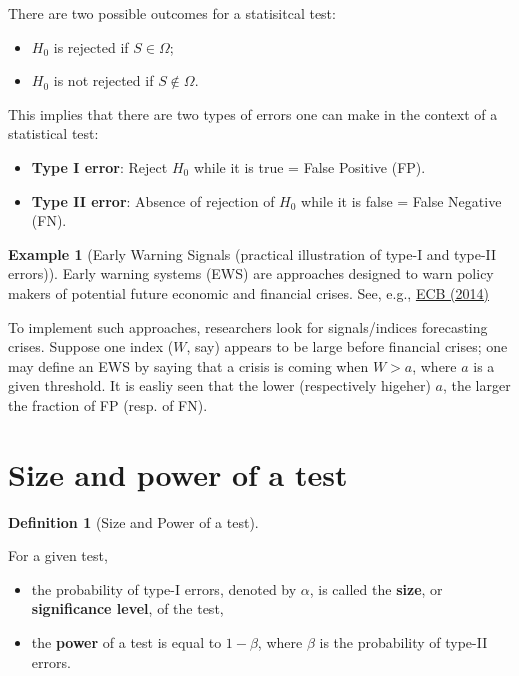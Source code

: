 \documentclass[
  12pt,
]{book}
\providecommand{\tightlist}{%
  \setlength{\itemsep}{0pt}\setlength{\parskip}{0pt}}
\theoremstyle{definition}
\newtheorem{definition}{Definition}[chapter]
\theoremstyle{definition}
\newtheorem{example}{Example}[chapter]
\theoremstyle{definition}
\theoremstyle{definition}
\theoremstyle{remark}
\begin{document}
There are two possible outcomes for a statisitcal test:

\begin{itemize}
\tightlist
\item
  \(H_0\) is rejected if \(S \in \Omega\);
\item
  \(H_0\) is not rejected if \(S \not\in \Omega\).
\end{itemize}

This implies that there are two types of errors one can make in the context of a statistical test:

\begin{itemize}
\tightlist
\item
  \textbf{Type I error}: Reject \(H_0\) while it is true = False Positive (FP).
\item
  \textbf{Type II error}: Absence of rejection of \(H_0\) while it is false = False Negative (FN).
\end{itemize}

\begin{example}[Early Warning Signals (practical illustration of type-I and type-II errors)]
\protect\hypertarget{exm:FPFN}{}\label{exm:FPFN}Early warning systems (EWS) are approaches designed to warn policy makers of potential future economic and financial crises. See, e.g., \href{http://www.ecb.europa.eu/events/pdf/conferences/140623/Vasicek-et-al_Comparing-Different-Early-Warning-Systems.pdf?F96bbb525a26071ecf97f9154fb3cc73}{ECB (2014)}

To implement such approaches, researchers look for signals/indices forecasting crises. Suppose one index (\(W\), say) appears to be large before financial crises; one may define an EWS by saying that a crisis is coming when \(W>a\), where \(a\) is a given threshold. It is easliy seen that the lower (respectively higeher) \(a\), the larger the fraction of FP (resp. of FN).
\end{example}

\hypertarget{size-and-power-of-a-test}{%
\section{Size and power of a test}\label{size-and-power-of-a-test}}

\begin{definition}[Size and Power of a test]
\protect\hypertarget{def:sizepower}{}\label{def:sizepower}

For a given test,

\begin{itemize}
\tightlist
\item
  the probability of type-I errors, denoted by \(\alpha\), is called the \textbf{size}, or \textbf{significance level}, of the test,
\item
  the \textbf{power} of a test is equal to \(1 - \beta\), where \(\beta\) is the probability of type-II errors.
\end{itemize}

\end{definition}
\end{document}
